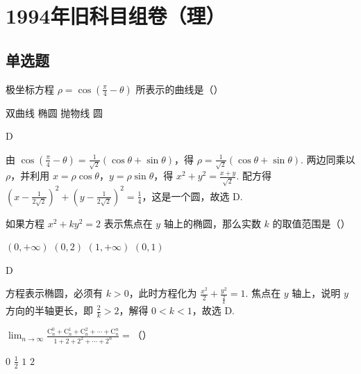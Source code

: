 \documentclass[UTF8,a4paper,oneside,11pt]{ctexbook}
\begin{document}
\mainmatter

\chapter{1994年旧科目组卷（理）}

\section{单选题}

\begin{problem}
极坐标方程 \(\rho = \cos \left(\frac{\pi}{4} - \theta\right)\) 所表示的曲线是（\quad）

\choices
    {双曲线}
    {椭圆}
    {抛物线}
    {圆}
\end{problem}

\begin{answer}
D
\end{answer}

\begin{solution}
由 \(\cos \left(\frac{\pi}{4} - \theta\right) = \frac{1}{\sqrt{2}}\left(\cos \theta + \sin \theta\right)\)，得 \(\rho = \frac{1}{\sqrt{2}}\left(\cos \theta + \sin \theta\right)\). 两边同乘以 \(\rho\)，并利用 \(x = \rho \cos \theta\)，\(y = \rho \sin \theta\)，得 \(x^2 + y^2 = \frac{x + y}{\sqrt{2}}\). 配方得 \(\left(x - \frac{1}{2\sqrt{2}}\right)^2 + \left(y - \frac{1}{2\sqrt{2}}\right)^2 = \frac{1}{4}\)，这是一个圆，故选 D.
\end{solution}

\begin{problem}
如果方程 \(x^2 + ky^2 = 2\) 表示焦点在 \(y\) 轴上的椭圆，那么实数 \(k\) 的取值范围是（\quad）

\choices
    {\((0, +\infty)\)}
    {\((0, 2)\)}
    {\((1, +\infty)\)}
    {\((0, 1)\)}
\end{problem}

\begin{answer}
D
\end{answer}

\begin{solution}
方程表示椭圆，必须有 \(k > 0\)，此时方程化为 \(\frac{x^2}{2} + \frac{y^2}{\frac{2}{k}} = 1\). 焦点在 \(y\) 轴上，说明 \(y\) 方向的半轴更长，即 \(\frac{2}{k} > 2\)，解得 \(0 < k < 1\)，故选 D.
\end{solution}

\begin{problem}
\(\displaystyle\lim_{n \to \infty} \frac{\mathrm C_n^0 + \mathrm C_n^1 + \mathrm C_n^2 + \cdots + \mathrm C_n^n}{1 + 2 + 2^2 + \cdots + 2^n} =\)（\quad）

\choices
    {\(0\)}
    {\(\frac{1}{2}\)}
    {\(1\)}
    {\(2\)}
\end{problem}
\end{document}
